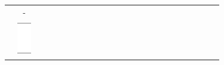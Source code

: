\documentclass[10pt]{article}
\begin{document}
\begin{center}
\begin{tabular}{|c|c|c|c|c|c|c|c|c|c|c|c|c|c|c|c|c|c|c|c|c|c|c|c|}
 &  &  &  &  &  &  &  &  &  &  &  &  &  &  &  &  &  &  &  &  &  &  \\
\hline
 & - &  &  &  &  &  &  &  &  &  &  &  &  &  &  &  &  &  &  &  &  &  &  \\
\hline
 & \includegraphics[max width=\textwidth]{2024_11_21_0c267759828927e3a26dg-09(2)}

\end{tabular}
\end{center}
\end{document}
